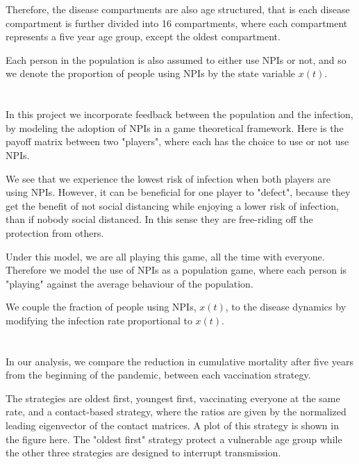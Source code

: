 \documentclass{article}
\begin{document}
Therefore, the disease compartments are also age structured, that is each disease compartment is further divided into 16 compartments, where each compartment represents a five year age group, except the oldest compartment.



Each person in the population is also assumed to either use NPIs or not, and so we denote the proportion of people using NPIs by the state variable $x(t)$.



\section{}
In this project we incorporate feedback between the population and the infection, by modeling the adoption of NPIs in a game theoretical framework. Here is the payoff matrix between two "players", where each has the choice to use or not use NPIs. 

We see that we experience the lowest risk of infection when both players are using NPIs. However, it can be beneficial for one player to "defect", because they get the benefit of not social distancing while enjoying a lower risk of infection, than if nobody social distanced. In this sense they are free-riding off the protection from others.

Under this model, we are all playing this game, all the time with everyone. Therefore we model the use of NPIs as a population game, where each person is "playing" against the average behaviour of the population.

We couple the fraction of people using NPIs, $x(t)$,  to the disease dynamics by modifying the infection rate proportional to $x(t)$.

\section{}

In our analysis, we compare the reduction in  cumulative mortality after five years from the beginning of the pandemic, between each vaccination strategy.

The strategies are oldest first, youngest first, vaccinating everyone at the same rate, and a contact-based strategy, where the ratios are given by the normalized leading eigenvector of the contact matrices. A plot of this strategy is shown in the figure here. The "oldest first" strategy protect a vulnerable age group while the other three strategies are designed to interrupt transmission.
\end{document}
